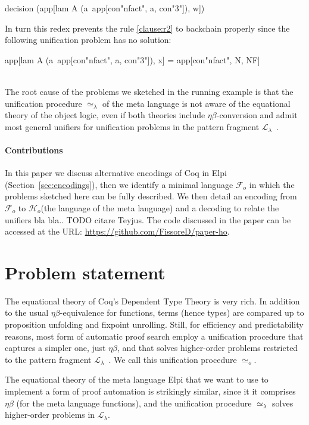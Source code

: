 \documentclass[sigconf,natbib=false,review]{acmart}
\newcommand{\UnifRel}{\ensuremath{\simeq}}
\newcommand{\Uo}{\ensuremath{\UnifRel_o}\xspace}
\newcommand{\Ue}{\ensuremath{\UnifRel_\lambda}\xspace}
\newcommand{\llambda}{\ensuremath{\mathcal{L}_\lambda}\xspace}
\newcommand{\Fo}{\ensuremath{\mathcal{F}_{\!o}\xspace}} %
\newcommand{\Ho}{\ensuremath{\mathcal{H}_o}\xspace}
\begin{document}
\begin{elpicode}
decision (app[lam A (a\ app[con"nfact", a, con"3"]), w])
\end{elpicode}

\noindent
In turn this redex prevents the rule \ref{clause:r2} to backchain properly since
the following unification problem has no solution:

\begin{elpicode}
app[lam A (a\ app[con"nfact", a, con"3"]), x] =
app[con"nfact", N, NF]
\end{elpicode}
\noindent
~\\
The root cause of the problems we sketched in the running example
is that the unification procedure \Ue of the meta language is not aware
of the equational theory of the object logic, even if both theories
include $\eta\beta$-conversion and admit most general
unifiers for unification problems in the pattern fragment \llambda~\cite{miller92jsc}.

\paragraph{Contributions}
In this paper we discuss alternative encodings of Coq in
Elpi (Section~\ref{sec:encodings}), then we identify a minimal language \Fo{}
in which the problems sketched here can be fully described.
We then detail an encoding  from \Fo{} to \Ho (the language of
the meta language) and a decoding  to relate the unifiers
bla bla.. TODO citare Teyjus.
The code discussed in the paper can be accessed at the URL:
\url{https://github.com/FissoreD/paper-ho}.

\section{Problem statement} %
\label{sec:problem-statement}

The equational theory of Coq's Dependent Type Theory is very rich. In
addition to the usual $\eta\beta$-equivalence for functions, terms (hence types)
are compared up to proposition unfolding and fixpoint unrolling. Still,
for efficiency and predictability reasons, most form of automatic proof search
employ a unification procedure that captures a simpler one,
just $\eta\beta$, and that solves higher-order problems
restricted to the pattern fragment $\llambda$~\cite{miller92jsc}.
We call this unification procedure \Uo{}.

The equational theory of the meta language Elpi that we want to use to
implement a form of proof automation is strikingly similar, since it
it comprises $\eta\beta$ (for the meta language functions), and the
unification procedure \Ue{} solves higher-order problems in
$\llambda$.
\end{document}
